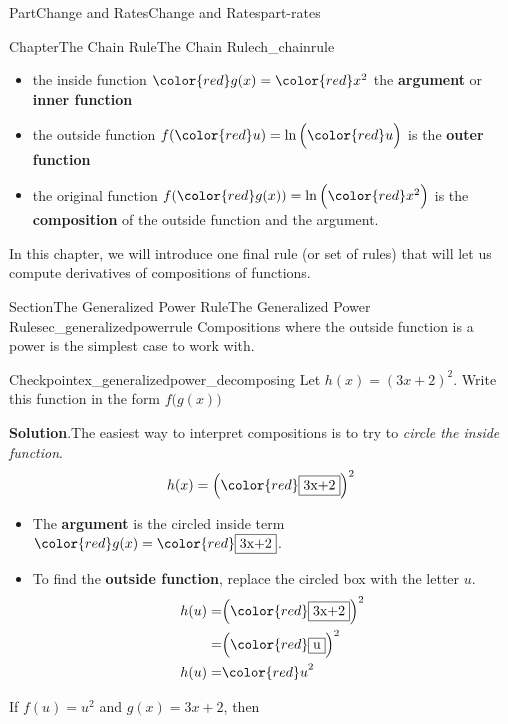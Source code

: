 \documentclass[oneside,10pt,]{tufte-book}
\newcommand{\blocktitlefont}{\relax}
\newcommand{\terminology}[1]{\textbf{#1}}
\numberwithin{equation}{chapter}
\newcommand{\red}[1]{   {\color{red}   #1}   }
\newcommand{\amp}{&}
\begin{document}
\begin{partptx}{Part}{Change and Rates}{}{Change and Rates}{}{}{part-rates}
\begin{chapterptx}{Chapter}{The Chain Rule}{}{The Chain Rule}{}{}{ch_chainrule}
\begin{introduction}{}
\begin{itemize}[label=\textbullet]
\item{}the inside function \(\red{g(x)} = \red{x^2}\) the \terminology{argument} or \terminology{inner function}%
\item{}the outside function \(f(\red{u}) = \ln\Big(\red{u}\Big)\) is the \terminology{outer function}%
\item{}the original function \(f(\red{g(x)}) = \ln\Big( \red{x^2} \Big)\) is the \terminology{composition} of the outside function and the argument.%
\end{itemize}
%
\par
In this chapter, we will introduce one final rule (or set of rules) that will let us compute derivatives of compositions of functions.%
\end{introduction}%
%
%
\typeout{************************************************}
\typeout{************************************************}
%
\begin{sectionptx}{Section}{The Generalized Power Rule}{}{The Generalized Power Rule}{}{}{sec_generalizedpowerrule}
Compositions where the outside function is a power is the simplest case to work with.%
\begin{inlineexercise}{Checkpoint}{}{ex_generalizedpower_decomposing}%
Let \(h(x) = (3x+2)^2\). Write this function in the form \(f\Big(g(x)\Big)\)%
\par\smallskip%
\noindent\textbf{\blocktitlefont Solution}.\hypertarget{ex_generalizedpower_decomposing-2}{}\quad{}The easiest way to interpret compositions is to try to \emph{circle the inside function}.%
\begin{equation*}
h(x) = \Big( \red{\framebox{3x+2}} \Big)^2
\end{equation*}
%
\begin{itemize}[label=\textbullet]
\item{}The \terminology{argument} is the circled inside term \(\red{g(x)} = \color{red} \framebox{3x+2}\).%
\item{}To find the \terminology{outside function}, replace the circled box with the letter \(u\).%
\begin{align*}
h(u) = \amp \Big( \red{\framebox{3x+2}} \Big)^2  \\
= \amp \Big( \red{\framebox{u}} \Big)^2  \\
h(u) = \amp \red{u}^2
\end{align*}
%
\end{itemize}
If \(f(u) = u^2\) and \(g(x) = 3x+2\), then%

\end{inlineexercise}
\end{sectionptx}
\end{chapterptx}
\end{partptx}
\end{document}
